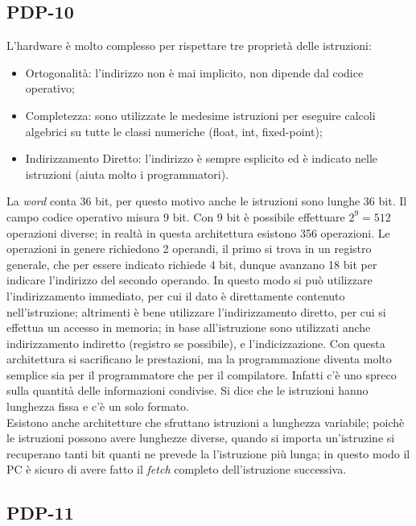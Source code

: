 \documentclass{article}
\begin{document}
\subsection{PDP-10}

L'hardware è molto complesso per rispettare tre proprietà delle istruzioni:
\begin{itemize}
	\item Ortogonalità: l'indirizzo non è mai implicito, non dipende dal codice operativo;

	\item Completezza: sono utilizzate le medesime istruzioni per eseguire calcoli algebrici su tutte le classi numeriche (float, int, fixed-point);

	\item Indirizzamento Diretto: l'indirizzo è sempre esplicito ed è indicato nelle istruzioni (aiuta molto i programmatori).
\end{itemize}

La \textit{word} conta 36 bit, per questo motivo anche le istruzioni sono lunghe 36 bit. Il campo codice operativo misura 9 bit. Con 9 bit è possibile effettuare $2^{9}=512$ operazioni diverse; in realtà in questa architettura esistono 356 operazioni. Le operazioni in genere richiedono 2 operandi, il primo si trova in un registro generale, che per essere indicato richiede 4 bit, dunque avanzano 18 bit per indicare l'indirizzo del secondo operando. In questo modo si può utilizzare l'indirizzamento immediato, per cui il dato è direttamente contenuto nell'istruzione; altrimenti è bene utilizzare l'indirizzamento diretto, per cui si effettua un accesso in memoria; in base all'istruzione sono utilizzati anche indirizzamento indiretto (registro se possibile), e l'indicizzazione. Con questa architettura si sacrificano le prestazioni, ma la programmazione diventa molto semplice sia per il programmatore che per il compilatore. Infatti c'è uno spreco sulla quantità delle informazioni condivise. Si dice che le istruzioni hanno lunghezza fissa e c'è un solo formato.\\

Esistono anche architetture che sfruttano istruzioni a lunghezza variabile; poichè le istruzioni possono avere lunghezze diverse, quando si importa un'istruzine si recuperano tanti bit quanti ne prevede la l'istruzione più lunga; in questo modo il PC è sicuro di avere fatto il \textit{fetch} completo dell'istruzione successiva.

\subsection{PDP-11}
\end{document}
